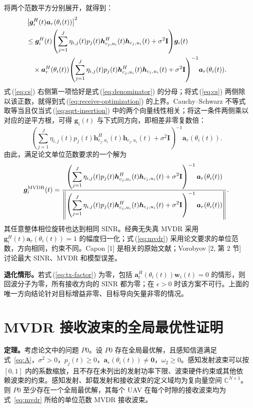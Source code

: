 \documentclass[11pt,a4paper]{ctexart}
\begin{document}
将两个范数平方分别展开，就得到：
\begin{align}
&\left|\bm g_i^H(t)\bm a_r(\theta_i(t))\right|^2\notag\\
&\le\bm g_i^H(t)\!\left(\sum_{j=1}^J\eta_{i,j}(t)p_j(t)
\bm h_{c_j,u_i}^{H}(t)\bm h_{c_j,u_i}(t)+\sigma^2\mathbf I\right)\!\bm g_i(t)\notag\\
&\quad\times\bm a_r^H(\theta_i(t))\!\left(\sum_{j=1}^J\eta_{i,j}(t)p_j(t)
\bm h_{c_j,u_i}^{H}(t)\bm h_{c_j,u_i}(t)+\sigma^2\mathbf I\right)^{-1}\!\bm a_r(\theta_i(t)).\label{eq:cs}
\end{align}
式\,(\ref{eq:cs}) 右侧第一项恰好是式\,(\ref{eq:denominator}) 的分母；将式\,(\ref{eq:cs}) 两侧除以该正数，就得到式\,(\ref{eq:receive-optimization}) 的上界。Cauchy--Schwarz 不等式取等当且仅当式\,(\ref{eq:sqrt-insertion}) 中的两个向量线性相关；将这一条件两侧乘以对应的逆平方根，可得 $\bm g_i(t)$ 与下式同方向，即相差非零复数倍：
\begin{equation}\label{eq:direction}
\left(\sum_{j=1}^J\eta_{i,j}(t)p_j(t)
\bm h_{c_j,u_i}^{H}(t)\bm h_{c_j,u_i}(t)+\sigma^2\mathbf I\right)^{-1}
\bm a_r(\theta_i(t)).
\end{equation}
由此，满足论文单位范数要求的一个解为
\begin{equation}\label{eq:mvdr}
\bm g_i^{\rm MVDR}(t)=
\frac{\left(\displaystyle\sum_{j=1}^J\eta_{i,j}(t)p_j(t)
\bm h_{c_j,u_i}^{H}(t)\bm h_{c_j,u_i}(t)+\sigma^2\mathbf I\right)^{-1}
\bm a_r(\theta_i(t))}
{\left\|\left(\displaystyle\sum_{j=1}^J\eta_{i,j}(t)p_j(t)
\bm h_{c_j,u_i}^{H}(t)\bm h_{c_j,u_i}(t)+\sigma^2\mathbf I\right)^{-1}
\bm a_r(\theta_i(t))\right\|}.
\end{equation}
其任意整体相位旋转也达到相同 SINR。经典无失真 MVDR 采用 $\bm g_i^H(t)\bm a_r(\theta_i(t))=1$ 的幅度归一化；式\,(\ref{eq:mvdr}) 采用论文要求的单位范数，方向相同，约束不同。Capon [1] 是相关的原始文献；Vorobyov [2, 第 2 节] 讨论最大 SINR、MVDR 和模型误差。

\textbf{退化情形。}若式\,(\ref{eq:tx-factor}) 为零，包括 $\bm a_t^H(\theta_i(t))\bm w_i(t)=0$ 的情形，则回波分子为零，所有接收方向的 SINR 都为零；在 $\epsilon>0$ 时该方案不可行。上面的唯一方向结论针对目标增益非零、目标导向矢量非零的情况。

\section{MVDR 接收波束的全局最优性证明}

\noindent\textbf{定理。}考虑论文中的问题 $P0$。设 $P0$ 存在全局最优解，且感知信道满足式~\eqref{eq:A}，$\sigma^2>0$，$p_j(t)\ge 0$，$\bm a_r(\theta_i(t))\ne\bm 0$，$\omega_2\ge 0$。感知发射波束可以按 $[0,1]$ 内的系数缩放，且不存在未列出的发射功率下限、波束硬件约束或其他依赖波束的约束。感知发射、卸载发射和接收波束的定义域均为复向量空间 $\mathbb C^{N\times1}$。
则 $P0$ 至少存在一个全局最优解，其每个 UAV 在每个时隙的接收波束均为式~\eqref{eq:mvdr} 所给的单位范数 MVDR 接收波束。
\end{document}
